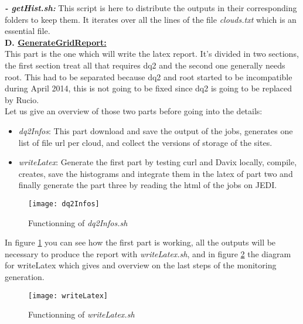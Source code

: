 \indent \textit{\textbf{- getHist.sh:}} This script is here to distribute the outputs in their corresponding folders to keep them. It iterates over all the lines of the file \textit{clouds.txt} which is an essential file.\\


\indent \textbf{D. \underline{GenerateGridReport:}}\\

This part is the one which will write the latex report. It's divided in two sections, the first section treat all that requires dq2 and the second one generally needs root. This had to be separated because dq2 and root started to be incompatible during April 2014, this is not going to be fixed since dq2 is going to be replaced by Rucio.\\

Let us give an overview of those two parts before going into the details:

\begin{itemize}
	\item \textit{dq2Infos}: This part download and save the output of the jobs, generates one list of file url per cloud, and collect the versions of storage of the sites.
	\item \textit{writeLatex}: Generate the first part by testing curl and Davix locally, compile, creates, save the histograms and integrate them in the latex of part two and finally generate the part three by reading the html of the jobs on JEDI.
\end{itemize}


\begin{figure}
	\center
	\texttt{[image: dq2Infos]}
	\caption{Functionning of \textit{dq2Infos.sh}}
	\label{fig:dq2Infos}
\end{figure}

In figure \ref{fig:dq2Infos} you can see how the first part is working, all the outputs will be necessary to produce the report with \textit{writeLatex.sh}, and in figure \ref{fig:writeLatex} the diagram for writeLatex which gives and overview on the last steps of the monitoring generation.


\begin{figure}
	\center
	\texttt{[image: writeLatex]}
	\caption{Functionning of \textit{writeLatex.sh}}
	\label{fig:writeLatex}
\end{figure}
